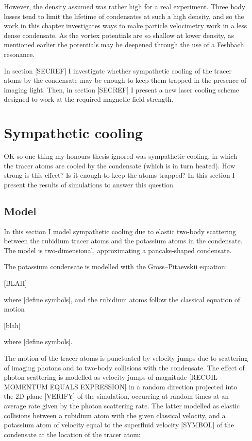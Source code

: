 However, the density assumed was rather high for a real experiment. Three body losses tend to limit the lifetime of condensates at such a high density, and so the work in this chapter investigates ways to make particle velocimetry work in a less dense condensate. As the vortex potentials are so shallow at lower density, as mentioned earlier the potentials may be deepened through the use of a Feshbach resonance.

In section [SECREF] I investigate whether sympathetic cooling of the tracer atoms by the condensate may be enough to keep them trapped in the presence of imaging light. Then, in section [SECREF] I present a new laser cooling scheme designed to work at the required magnetic field strength.

\section{Sympathetic cooling}

OK so one thing my honours thesis ignored was sympathetic cooling, in which the tracer atoms are cooled by the condensate (which is in turn heated). How strong is this effect? Is it enough to keep the atoms trapped? In this section I present the results of simulations to answer this question

\subsection{Model}

In this section I model sympathetic cooling due to elastic two-body scattering between the rubidium tracer atoms and the potassium atoms in the condensate. The model is two-dimensional, approximating a pancake-shaped condensate.

The potassium condensate is modelled with the Gross--Pitaevskii equation:

[BLAH]

where [define symbols], and the rubidium atoms follow the classical equation of motion

[blah]

where [define symbols].

The motion of the tracer atoms is punctuated by velocity jumps due to scattering of imaging photons and to two-body collisions with the condensate. The effect of photon scattering is modelled as velocity jumps of magnitude [RECOIL MOMENTUM EQUALS EXPRESSION] in a random direction projected into the 2D plane [VERIFY] of the simulation, occurring at random times at an average rate given by the photon scattering rate. The latter modelled as elastic collisions between a rubidium atom with the given classical velocity, and a potassium atom of velocity equal to the superfluid velocity [SYMBOL] of the condensate at the location of the tracer atom:

